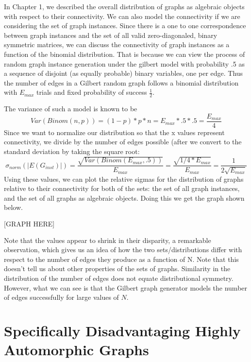 In Chapter 1, we described the overall distribution of graphs as algebraic objects with respect to their connectivity.
We can also model the connectivity if we are considering the set of graph instances.
Since there is a one to one correspondence between graph instances and the set of all valid zero-diagonaled, binary symmetric matrices, we can discuss the connectivity of graph instances as a function of the binomial distribution.
That is because we can view the process of random graph instance generation under the gilbert model with probability .5 as a sequence of disjoint (as equally probable) binary variables, one per edge.
Thus the number of edges in a Gilbert random graph follows a binomial distribution with $E_{max}$ trials and fixed probability of success $\frac{1}{2}$.

The variance of such a model is known to be 
$$Var(Binom(n, p)) = (1-p) * p * n = E_{max} * .5 * .5 = \frac{E_{max}}{4}$$
Since we want to normalize our distribution so that the x values represent connectivity, we divide by the number of edges possible (after we convert to the standard deviation by taking the square root:
$$\sigma_{norm}(|E(G_{inst})|) = \frac{\sqrt{Var(Binom(E_{max}, .5))}}{E_{max}} = \frac{\sqrt{1/4 * E_{max}}}{E_{max}}  = \frac{1}{2\sqrt{E_{max}}}$$
Using these values, we can plot the relative sigmas for the distribution of graphs relative to their connectivity for both of the sets: the set of all graph instances, and the set of all graphs as algebraic objects.
Doing this we get the graph shown below.

[GRAPH HERE]

Note that the values appear to shrink in their disparity, a remarkable observation, which gives us an idea of how the two sets/distributions differ with respect to the number of edges they produce as a function of N.
Note that this doesn't tell us about other properties of the sets of graphs.
Similarity in the distribution of the number of edges does not equate distributional symmetry.
However, what we can see is that the Gilbert graph generator models the number of edges successfully for large values of $N$.


\section{Specifically Disadvantaging Highly Automorphic Graphs}

